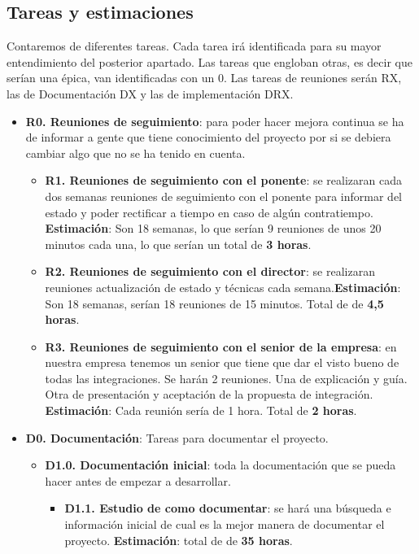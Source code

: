 \documentclass[12pt]{article}
\begin{document}
    \subsection{Tareas y estimaciones}\label{sec:tareas}
    Contaremos de diferentes tareas. Cada tarea irá identificada para su mayor entendimiento del posterior apartado. Las tareas que engloban otras, es decir que serían una épica, van identificadas con un 0. Las tareas de reuniones serán RX, las de Documentación DX y las de implementación DRX.
    \begin{itemize}
        \item \textbf{R0. Reuniones de seguimiento}: para poder hacer mejora continua se ha de informar a gente que tiene conocimiento del proyecto por si se debiera cambiar algo que no se ha tenido en cuenta. 
            \begin{itemize}
                \item \textbf{R1. Reuniones de seguimiento con el ponente}: se realizaran cada dos semanas reuniones de seguimiento con el ponente para informar del estado y poder rectificar a tiempo en caso de algún contratiempo. \textbf{Estimación}:  Son 18 semanas, lo que serían 9 reuniones de unos 20 minutos cada una, lo que serían un total de \textbf{3 horas}.
                \item \textbf{R2. Reuniones de seguimiento con el director}: se realizaran reuniones actualización de estado y técnicas cada semana.\textbf{Estimación}:  Son 18 semanas, serían 18 reuniones de 15 minutos. Total de  de \textbf{4,5 horas}.
                \item \textbf{R3. Reuniones de seguimiento con el senior de la empresa}: en nuestra empresa tenemos un senior que tiene que dar el visto bueno de todas las integraciones. Se harán 2 reuniones. Una de explicación y guía. Otra de presentación y aceptación de la propuesta de integración. \textbf{Estimación}:  Cada reunión sería de 1 hora. Total de \textbf{2 horas}.
            \end{itemize}
        \item \textbf{D0. Documentación}: Tareas para documentar el proyecto.
            \begin{itemize}
                \item \textbf{D1.0. Documentación inicial}: toda la documentación que se pueda hacer antes de empezar a desarrollar. 
                    \begin{itemize}
                        \item \textbf{D1.1. Estudio de como documentar}: se hará una búsqueda e información inicial de cual es la mejor manera de documentar el proyecto. \textbf{Estimación}: total de  de \textbf{35 horas}.

\end{itemize}
\end{itemize}
\end{itemize}
\end{document}

